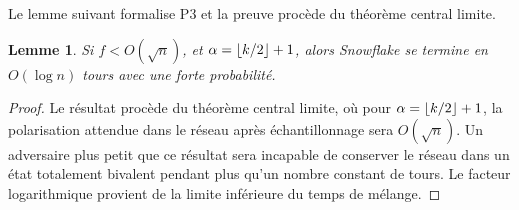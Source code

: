 \documentclass[a4,twocolumn,10pt]{article}
\DeclarePairedDelimiter{\floor}{\lfloor}{\rfloor}
\newcommand{\Oh}[1]{O(#1)}
\newtheorem{lemma}[theorem]{Lemme}
\theoremstyle{definition}
\begin{document}
\begin{appendices}
Le lemme suivant formalise P3 et la preuve procède du théorème central limite.
\begin{lemma}
Si $f < \Oh{\sqrt{n}}$, et $\alpha = \floor{k/2} + 1$, alors Snowflake se termine en $\Oh{\log n}$ tours avec une forte probabilité. 
\label{lemma:centrallimit}
\end{lemma}
\begin{proof}
Le résultat procède du théorème central limite, où pour $\alpha = \floor{k/2} + 1$, la polarisation
attendue dans le réseau après échantillonnage sera $\Oh{\sqrt{n}}$. Un adversaire plus petit que ce résultat sera incapable de conserver le réseau dans un état totalement bivalent pendant plus qu'un nombre constant de tours. Le facteur logarithmique provient de la limite inférieure du temps de mélange.
\end{proof}


\end{appendices}
\end{document}
